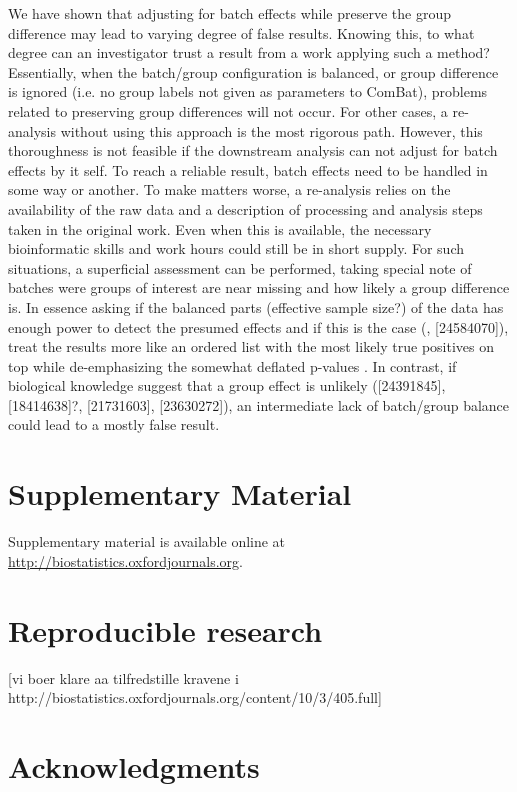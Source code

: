 \documentclass{bio}
\newcommand\NOTE[1]{{\color{red}[#1]}}
\newcommand\CITE[1]{{\color{magenta}[#1]}}
\begin{document}
We have shown that adjusting for batch effects while preserve the group difference may lead to varying degree of false results. Knowing this, to what degree can an investigator trust a result from a work applying such a method? Essentially, when the batch/group configuration is balanced, or group difference is ignored  (i.e. no group labels not given as parameters to ComBat), problems related to preserving group differences will not occur. For other cases, a re-analysis without using this approach is the most rigorous path. However, this thoroughness is not feasible if the downstream  analysis can not adjust for batch effects by it self. To reach a reliable result, batch effects need to be handled in some way or another. To make matters worse, a re-analysis relies on the availability of the raw data and a description of processing and analysis steps taken in the original work. Even when this is available, the necessary bioinformatic skills and work hours could still be in short supply. For such situations, a superficial assessment can be performed, taking special note of batches were groups of interest are near missing and how likely a group difference is. In essence asking if the balanced parts (effective sample size?) of the data has enough power to detect the presumed effects and if this is the case (\citealp{Johnson2007}, \CITE{24584070}), treat the results more like an ordered list with the most likely true positives on top while de-emphasizing the somewhat deflated p-values . In contrast, if biological knowledge suggest that a group effect is unlikely  (\CITE{24391845}, \CITE{18414638}?, \CITE{21731603}, \CITE{23630272}), an intermediate lack of batch/group balance  could lead to a mostly false result.


\section{Supplementary Material}
\label{supp}

Supplementary material is available online at
\href{http://biostatistics.oxfordjournals.org}%
{http://biostatistics.oxfordjournals.org}.

\section*{Reproducible research}
\NOTE{vi boer klare aa tilfredstille kravene i http://biostatistics.oxfordjournals.org/content/10/3/405.full}


\section*{Acknowledgments}
\end{document}
